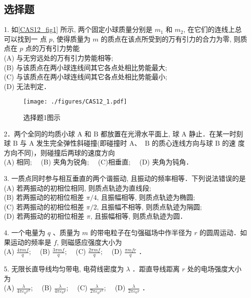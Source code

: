 \subsection{选择题}
1. 如\autoref{CAS12_fig1} 所示, 两个固定小球质量分别是 $m_{1}$ 和 $m_{2}$, 在它们的连线上总可以找到一
点 $p$, 使得质量为 $m$ 的质点在该点所受到的万有引力的合力为零, 则质点在 $p$
点的万有引力势能\\
(A) 与无穷远处的万有引力势能相等;\\
(B) 与该质点在两小球连线间其它各点处相比势能最大;\\
(C) 与该质点在两小球连线间其它各点处相比势能最小;\\
(D) 无法判定．
\begin{figure}[ht]
\centering
\texttt{[image: ./figures/CAS12\_1.pdf]}
\caption{选择题1图示} \label{CAS12_fig1}
\end{figure}
2．两个全同的均质小球 $\mathrm{A}$ 和 $\mathrm{B}$ 都放置在光滑水平面上, 球 $\mathrm{A}$ 静止．在某一时刻球 $\mathrm{B}$ 与 $\mathrm{A}$ 发生完全弹性斜碰撞(即碰撞时 $\mathrm{A}$、 $\mathrm{~B}$ 的质心连线方向与球 $\mathrm{B}$ 的速 度方向不同)，则碰撞后两球的速度方向\\
(A) 相同;$\quad$
(B) 夹角为锐角;$\quad$
(C)相垂直;$\quad$
(D) 夹角为钝角．

3. 一质点同时参与相互垂直的两个谐振动, 且振动的频率相等．下列说法错误的是\\
(A) 若两振动的初相位相同, 则质点轨迹为直线段;\\
(B) 若两振动的初相位相差 $\pi / 4$, 且振幅相等, 则质点轨迹为椭圆;\\
(C) 若两振动的初相位相差 $\pi / 2$, 且振幅不相等, 则质点轨迹为䧎圆;\\
(D) 若两振动的初相位相差 $\pi$, 且振幅相等, 则质点轨迹为圆．

4. 一个电量为 $q$ 、质量为 $m$ 的带电粒子在匀强磁场中作半径为 $r$ 的圆周运动．如果运动的频率是 $f$, 则磁感应强度大小为\\
(A) $\frac{4 \pi m f}{q}$;$\quad$
(B) $\frac{3 \pi m f}{q}$;$\quad$
(C) $\frac{2 \pi m f}{q}$;$\quad$
(D) $\frac{\pi m f r}{q}$ ．

5. 无限长直导线均匀带电, 电荷线密度为 $\lambda$ ．距直导线距离 $r$ 处的电场强度大小为\\
(A) $\frac{\lambda}{4 \pi \varepsilon_{0} r^{2}}$;$\quad$
(B) $\frac{\lambda}{4 \pi \varepsilon_{0} r}$;$\quad$
(C) $\frac{\lambda}{2 \pi \varepsilon_{0} r^{2}}$;$\quad$
(D) $\frac{\lambda}{2 \pi \varepsilon_{0} r}$ ．

